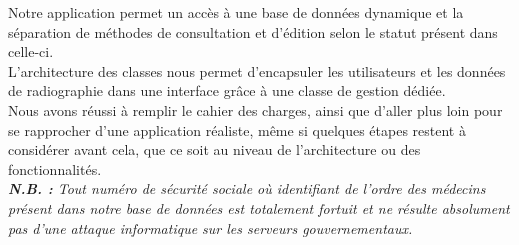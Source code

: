 \documentclass[12pt,a4paper]{article}
\begin{document}
\begin{multicols}{2}
		Notre application permet un accès à une base de données dynamique et la séparation de méthodes de consultation et d'édition selon le statut présent dans celle-ci. \\
		
		L'architecture des classes nous permet d'encapsuler les utilisateurs et les données de radiographie dans une interface grâce à une classe de gestion dédiée. \\
		
		Nous avons réussi à remplir le cahier des charges, ainsi que d'aller plus loin pour se rapprocher d'une application réaliste, même si quelques étapes restent à considérer avant cela, que ce soit au niveau de l'architecture ou des fonctionnalités. \\
		
		\textit{\textbf{N.B. :} Tout numéro de sécurité sociale où identifiant de l'ordre des médecins présent dans notre base de données est totalement fortuit et ne résulte absolument pas d'une attaque informatique sur les serveurs gouvernementaux.} \\
		
	\end{multicols}
	
\end{document}
